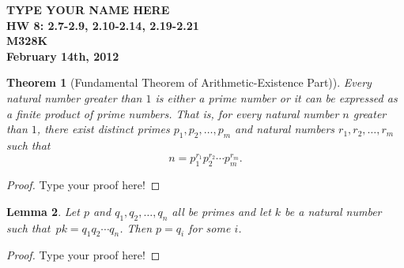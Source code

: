 \documentclass[12pt,leqno]{article}
\numberwithin{equation}{section}
\newtheorem{thm}{Theorem}[section]
\newtheorem{lem}[thm]{Lemma}
\theoremstyle{definition}
\begin{document}
\thispagestyle{plain}
\begin{flushright}
\large{\textbf{TYPE YOUR NAME HERE \\
HW 8: 2.7-2.9, 2.10-2.14, 2.19-2.21\\
M328K \\
February 14th, 2012 \\}}
\end{flushright}

\markboth{}{} \setcounter{section}{0} \baselineskip=18pt

\setcounter{tocdepth}{4}



\setcounter{section}{2}

\setcounter{thm}{6}


\begin{thm}[Fundamental Theorem of Arithmetic-Existence Part)]
Every natural number greater than $1$ is either a prime number or it
can be expressed as a finite product of prime numbers. That is, for
every natural number $n$ greater than $1$, there exist distinct
primes $p_1, p_2, \hdots, p_m$ and natural numbers $r_1, r_2,
\hdots, r_m$ such that \[n = p_1^{r_1}p_2^{r_2}\cdots p_m^{r_m}.\]
\end{thm}

\begin{proof}[Proof]
Type your proof here!
\end{proof}



\begin{lem}
Let $p$ and $q_1, q_2, \hdots, q_n$ all be primes and let $k$ be a
natural number such that~$p k = q_1q_2 \cdots q_n$.  Then $p = q_i$
for some $i$.
\end{lem}

\begin{proof}[Proof]
Type your proof here!
\end{proof}
\end{document}
